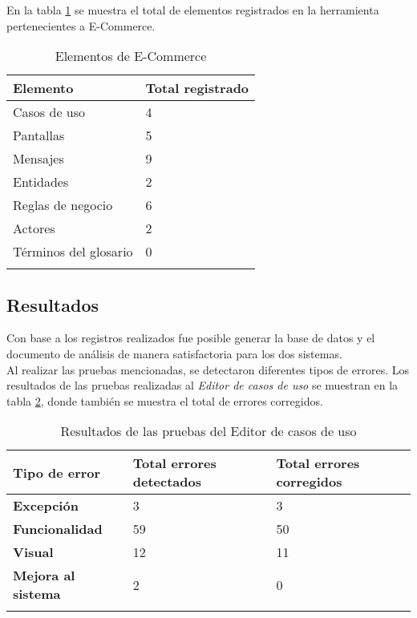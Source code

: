 En la tabla \ref{tabla:vectorEditor2} se muestra el total de elementos registrados en la herramienta pertenecientes a E-Commerce.

\begin{longtable}{| p{} | p{} |}%
	\arrayrulecolor{black}%
	\rowcolor{black}%
	{\color{white}Elemento} & {\color{white}Total registrado}\\ \hline
	\endhead%
	\arrayrulecolor{black}%
	Casos de uso & 4 \\ \hline
	Pantallas & 5 \\ \hline
	Mensajes & 9 \\ \hline
	Entidades & 2 \\ \hline
	Reglas de negocio & 6 \\ \hline
	Actores & 2 \\ \hline
	Términos del glosario  & 0 \\ \hline
	\caption{Elementos de E-Commerce}\label{tabla:vectorEditor2}
\end{longtable}%

\subsection*{Resultados}

Con base a los registros realizados fue posible generar la base de datos y el documento de análisis de manera satisfactoria para los dos sistemas. \\

Al realizar las pruebas mencionadas, se detectaron diferentes tipos de errores. Los resultados de las pruebas
realizadas al {\it Editor de casos de uso} se muestran en la tabla \ref{tabla:erroresEditor}, donde también se muestra el total de errores corregidos.

\begin{longtable}{| p{} | p{} | p{} |}%
	\arrayrulecolor{black}%
	\rowcolor{black}%
	{\color{white}Tipo de error} & {\color{white}Total errores detectados} & {\color{white}Total errores corregidos}\\ \hline
	\endhead%
	\arrayrulecolor{black}%
	{\bf Excepción} & 3 & 3 \\ \hline
	{\bf Funcionalidad} & 59 & 50 \\ \hline
	{\bf Visual} & 12 & 11 \\ \hline
	{\bf Mejora al sistema} & 2 & 0 \\ \hline
	\caption{Resultados de las pruebas del Editor de casos de uso}\label{tabla:erroresEditor}
\end{longtable}%

